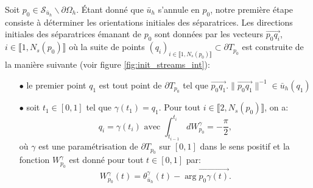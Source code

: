 Soit $p_0\in\mathcal{S}_{\bar{u}_h}\backslash\partial\Omega_h$. Étant donné que $\bar{u}_h$ s'annule en $p_0$, notre première étape consiste à déterminer les orientations initiales des séparatrices. Les directions initiales des séparatrices émanant de $p_0$ sont données par les vecteurs $\overrightarrow{p_0q_i}$, $i\in\llbracket 1, N_s(p_0) \rrbracket$ où la suite de points $(q_i)_{i\in\llbracket 1, N_s(p_0)\rrbracket}\subset\partial T_{p_0}$ est construite de la manière suivante (voir figure \ref{fig:init_streams_int}):\\
\begin{itemize}
    \item[$\bullet$] le premier point $q_1$ est tout point de $\partial T_{p_0}$ tel que $\overrightarrow{p_0q_1}.\|\overrightarrow{p_0q_1}\|^{-1}\in\bar{u}_h(q_1)$\\
    \item[$\bullet$] soit $t_1\in[0, 1]$ tel que $\gamma(t_1)=q_1$. Pour tout $i\in\llbracket 2, N_s(p_0)\rrbracket$, on a:
    $$
    q_i=\gamma(t_i)\mbox{ avec }\int_{t_{i-1}}^{t_i}dW_{p_0}^\gamma=-\frac{\pi}{2},
    $$
    où $\gamma$ est une paramétrisation de $\partial T_{p_0}$ sur $[0, 1]$ dans le sens positif et la fonction $W^\gamma_{p_0}$ est donné pour tout $t\in[0, 1]$ par:
    $$
    W_{p_0}^\gamma(t)=\theta^\gamma_{\bar{u}_h}(t)-\arg \overrightarrow{p_0\gamma(t)}.
    $$


\end{itemize}

